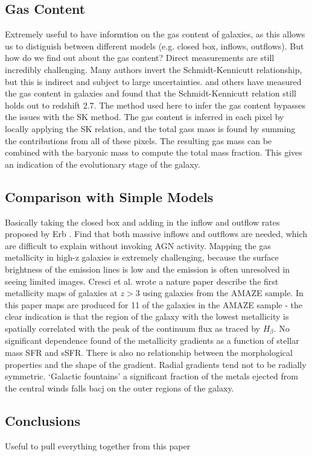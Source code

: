\documentclass{literature}
\begin{document}
\subsection{Gas Content}
Extremely useful to have informtion on the gas content of galaxies, as this allows us to distiguish between different models (e.g. closed box, inflows, outflows). But how do we find out about the gas content? Direct measurements are still incredibly challenging. Many authors invert the Schmidt-Kennicutt relationship, but this is indirect and subject to large uncertainties. \citep{Tacconi_2013} and others have measured the gas content in galaxies and found that the Schmidt-Kennicutt relation still holds out to redshift 2.7. The method used here to infer the gas content bypasses the issues with the SK method. The gas content is inferred in each pixel by locally applying the SK relation, and the total gass mass is found by summing the contributions from all of these pixels. The resulting gas mass can be combined with the baryonic mass to compute the total mass fraction. This gives an indication of the evolutionary stage of the galaxy. 

\subsection{Comparison with Simple Models}
Basically taking the closed box and adding in the inflow and outflow rates proposed by Erb \citep{Erb_2008}. Find that both massive inflows and outflows are needed, which are difficult to explain without invoking AGN activity. Mapping the gas metallicity in high-z galaxies is extremely challenging, because the surface brightness of the emission lines is low and the emission is often unresolved in seeing limited images. Cresci et al. \citep{Cresci_2010} wrote a nature paper describe the first metallicity maps of galaxies at $z > 3$ using galaxies from the AMAZE sample. In this paper maps are produced for 11 of the galaxies in the AMAZE sample - the clear indication is that the region of the galaxy with the lowest metallicity is spatially correlated with the peak of the continuum flux as traced by $H_{\beta}$. No significant dependence found of the metallicity gradients as a function of stellar mass SFR and sSFR. There is also no relationship between the morphological properties and the shape of the gradient. Radial gradients tend not to be radially symmetric. `Galactic fountains' a significant fraction of the metals ejected from the central winds falls bacj on the outer regions of the galaxy. 
\subsection{Conclusions}
Useful to pull everything together from this paper 
\end{document}
